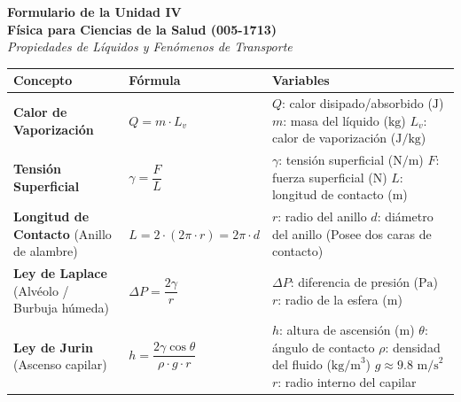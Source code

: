 \documentclass[12pt,letterpaper]{article}
\begin{document}
\begin{center}
    \textbf{\Large Formulario de la Unidad IV}\\
    \vspace{0.2cm}
    \textbf{Física para Ciencias de la Salud (005-1713)}\\
    \vspace{0.2cm}
    \textit{Propiedades de Líquidos y Fenómenos de Transporte}
\end{center}

\vspace{0.3cm}

\begin{table}[h!]
    \centering
    \renewcommand{\arraystretch}{1.25} %
    {\small
    \begin{tabular}{|>{\raggedright\arraybackslash}p{4cm}|>{\centering\arraybackslash}p{5.5cm}|>{\raggedright\arraybackslash}p{5cm}|}
        \hline
        \textbf{Concepto} & \textbf{Fórmula} & \textbf{Variables} \\
        \hline
        \textbf{Calor de Vaporización} & $Q = m \cdot L_v$ & $Q$: calor disipado/absorbido ($\text{J}$) \newline $m$: masa del líquido ($\text{kg}$) \newline $L_v$: calor de vaporización ($\text{J/kg}$) \\
        \hline
        \textbf{Tensión Superficial} & $\gamma = \dfrac{F}{L}$ & $\gamma$: tensión superficial ($\text{N/m}$) \newline $F$: fuerza superficial ($\text{N}$) \newline $L$: longitud de contacto ($\text{m}$) \\
        \hline
        \textbf{Longitud de Contacto} \newline (Anillo de alambre) & $L = 2 \cdot (2\pi \cdot r) = 2\pi \cdot d$ & $r$: radio del anillo \newline $d$: diámetro del anillo \newline (Posee dos caras de contacto) \\
        \hline
        \textbf{Ley de Laplace} \newline (Alvéolo / Burbuja húmeda) & $\Delta P = \dfrac{2\gamma}{r}$ & $\Delta P$: diferencia de presión ($\text{Pa}$) \newline $r$: radio de la esfera ($\text{m}$) \\
        \hline
        \textbf{Ley de Jurin} \newline (Ascenso capilar) & $h = \dfrac{2\gamma \cos \theta}{\rho \cdot g \cdot r}$ & $h$: altura de ascensión ($\text{m}$) \newline $\theta$: ángulo de contacto \newline $\rho$: densidad del fluido ($\text{kg/m}^3$) \newline $g \approx 9.8 \text{ m/s}^2$ \newline $r$: radio interno del capilar \\

\end{tabular}}
\end{table}
\end{document}
